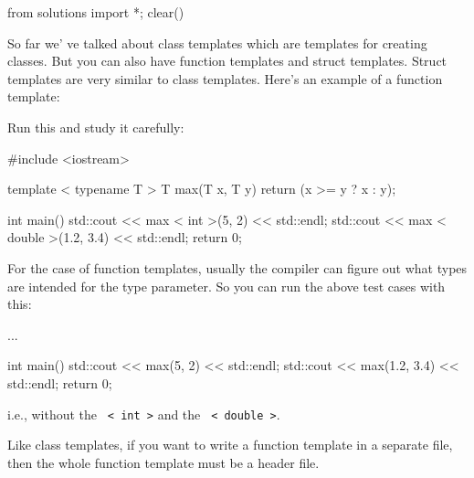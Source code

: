 \begin{python0}
from solutions import *; clear()
\end{python0}

So far we' ve talked about class templates which are templates for creating classes. But you can also have function templates and struct templates. Struct templates are very similar to class templates. Here's an example of a function template:

Run this and study it carefully:

\begin{console}
#include <iostream>

template  < typename T >
T max(T x, T y)
{    
     return (x >= y ? x : y);
}

int main()
{    
     std::cout << max < int >(5, 2) << std::endl;
     std::cout << max < double >(1.2, 3.4) << std::endl;
     return 0;
} 
\end{console}

For the case of function templates, usually the compiler can figure out
what types are intended for the type parameter. So you can run the above
test cases with this:

\begin{console}
...

int main()
{    
     std::cout << max(5, 2) << std::endl;
     std::cout << max(1.2, 3.4) << std::endl;
     return 0;
}
\end{console}

i.e., without the \texttt{ < int >} and the \texttt{ < double >}.

Like class templates, if you want to write a function template in a
separate file, then the whole function template must be a header file.




